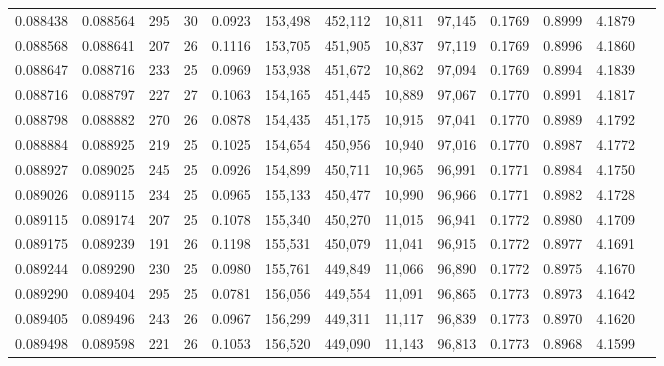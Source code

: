 \begin{tabular}{rrrrrrrrrrrrr}
0.088438 & 0.088564 & 295 &  30 &                                     0.0923 & 153,498 & 452,112 &  10,811 &  97,145 & 0.1769 & 0.8999 & 4.1879 \\
0.088568 & 0.088641 & 207 &  26 &                                     0.1116 & 153,705 & 451,905 &  10,837 &  97,119 & 0.1769 & 0.8996 & 4.1860 \\
0.088647 & 0.088716 & 233 &  25 &                                     0.0969 & 153,938 & 451,672 &  10,862 &  97,094 & 0.1769 & 0.8994 & 4.1839 \\
0.088716 & 0.088797 & 227 &  27 &                                     0.1063 & 154,165 & 451,445 &  10,889 &  97,067 & 0.1770 & 0.8991 & 4.1817 \\
0.088798 & 0.088882 & 270 &  26 &                                     0.0878 & 154,435 & 451,175 &  10,915 &  97,041 & 0.1770 & 0.8989 & 4.1792 \\
0.088884 & 0.088925 & 219 &  25 &                                     0.1025 & 154,654 & 450,956 &  10,940 &  97,016 & 0.1770 & 0.8987 & 4.1772 \\
0.088927 & 0.089025 & 245 &  25 &                                     0.0926 & 154,899 & 450,711 &  10,965 &  96,991 & 0.1771 & 0.8984 & 4.1750 \\
0.089026 & 0.089115 & 234 &  25 &                                     0.0965 & 155,133 & 450,477 &  10,990 &  96,966 & 0.1771 & 0.8982 & 4.1728 \\
0.089115 & 0.089174 & 207 &  25 &                                     0.1078 & 155,340 & 450,270 &  11,015 &  96,941 & 0.1772 & 0.8980 & 4.1709 \\
0.089175 & 0.089239 & 191 &  26 &                                     0.1198 & 155,531 & 450,079 &  11,041 &  96,915 & 0.1772 & 0.8977 & 4.1691 \\
0.089244 & 0.089290 & 230 &  25 &                                     0.0980 & 155,761 & 449,849 &  11,066 &  96,890 & 0.1772 & 0.8975 & 4.1670 \\
0.089290 & 0.089404 & 295 &  25 &                                     0.0781 & 156,056 & 449,554 &  11,091 &  96,865 & 0.1773 & 0.8973 & 4.1642 \\
0.089405 & 0.089496 & 243 &  26 &                                     0.0967 & 156,299 & 449,311 &  11,117 &  96,839 & 0.1773 & 0.8970 & 4.1620 \\
0.089498 & 0.089598 & 221 &  26 &                                     0.1053 & 156,520 & 449,090 &  11,143 &  96,813 & 0.1773 & 0.8968 & 4.1599 \\

\end{tabular}
